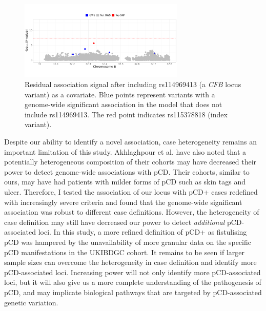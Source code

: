\begin{figure}
  \centering    
  \includegraphics[width=0.7\textwidth]{Vector/cond_mcgovern_regional_assoc_plot}
  \caption[Regional association plot of 6p21.32 conditional on the \textit{CFB} locus reported by Akhlaghpour et al.]{Residual association signal after including  rs114969413 (a \textit{CFB} locus variant) as a covariate. Blue points represent variants with a genome-wide significant association in the model that does not include rs114969413. The red point indicates rs115378818 (index variant).}
  \label{fig:cond_mcgovern}
  \end{figure}
  
  Despite our ability to identify a novel association, case heterogeneity remains an important limitation of this study. Akhlaghpour et al. have also noted that a potentially heterogeneous composition of their cohorts may have decreased their power to detect genome-wide associations with pCD. Their cohorts, similar to ours, may have had patients with milder forms of pCD such as skin tags and ulcer. Therefore, I tested the association of our locus with pCD+ cases redefined with increasingly severe criteria and found that the genome-wide significant association was robust to different case definitions. However, the heterogeneity of case definition may still have decreased our power to detect \textit{additional} pCD-associated loci. In this study, a more refined definition of pCD+ as fistulising pCD was hampered by the unavailability of more granular data on the specific pCD manifestations in the UKIBDGC cohort. It remains to be seen if larger sample sizes can overcome the heterogeneity in case definition and identify more pCD-associated loci. Increasing power will not only identify more pCD-associated loci, but it will also give us a more complete understanding of the pathogenesis of pCD, and may implicate biological pathways that are targeted by pCD-associated genetic variation. \\


